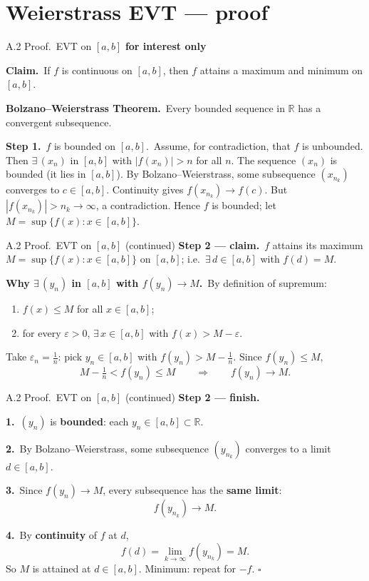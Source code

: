 \documentclass[11pt,aspectratio=169]{beamer}
\newcommand{\InterestOnly}{\textcolor{mAccent}{\textbf{for interest only}}}
\begin{document}
\section{Weierstrass EVT --- proof}

\begin{frame}{A.2 Proof.\ EVT on $[a,b]$}
  \hypertarget{sec:weierstrass-proof}{}
  \footnotesize
  \InterestOnly

  \medskip
  \textbf{Claim.}\ If $f$ is continuous on $[a,b]$, then $f$ attains a maximum and minimum on $[a,b]$.

  \medskip
  \textbf{Bolzano--Weierstrass Theorem.}\
  Every bounded sequence in $\mathbb{R}$ has a convergent subsequence.

  \medskip
  \textbf{Step 1.}\ $f$ is bounded on $[a,b]$.\
  Assume, for contradiction, that $f$ is unbounded.
  Then $\exists\,(x_n)$ in $[a,b]$ with $|f(x_n)|>n$ for all $n$.
  The sequence $(x_n)$ is bounded (it lies in $[a,b]$).
  By Bolzano--Weierstrass, some subsequence $(x_{n_k})$ converges to $c\in[a,b]$.
  Continuity gives $f(x_{n_k})\to f(c)$.
  But $|f(x_{n_k})|>n_k\to\infty$, a contradiction.
  Hence $f$ is bounded; let $M=\sup\{f(x):x\in[a,b]\}$.
\end{frame}

\begin{frame}{A.2 Proof.\ EVT on $[a,b]$ (continued)}
  \footnotesize
  \textbf{Step 2 --- claim.}\
  $f$ attains its maximum $M=\sup\{f(x):x\in[a,b]\}$ on $[a,b]$;
  i.e.\ $\exists\,d\in[a,b]$ with $f(d)=M$.

  \medskip
  \textbf{Why $\exists\,(y_n)$ in $[a,b]$ with $f(y_n)\to M$.}\
  By definition of supremum:
  \begin{enumerate}
    \item $f(x)\le M$ for all $x\in[a,b]$;
    \item for every $\varepsilon>0$, $\exists\,x\in[a,b]$ with $f(x)>M-\varepsilon$.
  \end{enumerate}
  Take $\varepsilon_n=\tfrac1n$: pick $y_n\in[a,b]$ with $f(y_n)>M-\tfrac1n$.
  Since $f(y_n)\le M$,
  \[
    M-\tfrac1n < f(y_n)\le M
    \qquad\Rightarrow\qquad
    f(y_n)\to M.
  \]
\end{frame}

\begin{frame}{A.2 Proof.\ EVT on $[a,b]$ (continued)}
  \footnotesize
  \textbf{Step 2 --- finish.}

  \medskip
  \textbf{1.}\ $(y_n)$ is \textbf{bounded}: each $y_n\in[a,b]\subset\mathbb{R}$.

  \medskip
  \textbf{2.}\ By Bolzano--Weierstrass, some subsequence $(y_{n_k})$ converges to a limit
  $d\in[a,b]$.

  \medskip
  \textbf{3.}\ Since $f(y_n)\to M$, every subsequence has the \textbf{same limit}:
  \[
    f(y_{n_k})\to M.
  \]

  \medskip
  \textbf{4.}\ By \textbf{continuity} of $f$ at $d$,
  \[
    f(d)=\lim_{k\to\infty} f(y_{n_k})=M.
  \]
  So $M$ is attained at $d\in[a,b]$.
  {\scriptsize Minimum: repeat for $-f$.}
  \hfill$\square$
\end{frame}
\end{document}
